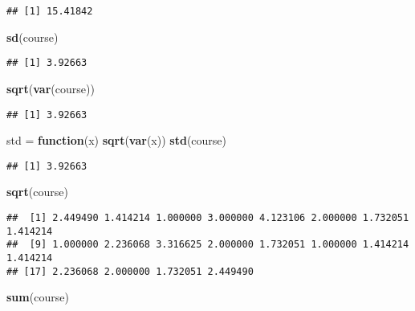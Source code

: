 \documentclass[
]{article}
\newenvironment{Shaded}{\begin{snugshade}}{\end{snugshade}}
\newcommand{\ControlFlowTok}[1]{\textcolor[rgb]{0.13,0.29,0.53}{\textbf{#1}}}
\newcommand{\FunctionTok}[1]{\textcolor[rgb]{0.13,0.29,0.53}{\textbf{#1}}}
\newcommand{\NormalTok}[1]{#1}
\newcommand{\OtherTok}[1]{\textcolor[rgb]{0.56,0.35,0.01}{#1}}
\begin{document}
\begin{verbatim}
## [1] 15.41842
\end{verbatim}

\begin{Shaded}
\begin{Highlighting}[]
\FunctionTok{sd}\NormalTok{(course)}
\end{Highlighting}
\end{Shaded}

\begin{verbatim}
## [1] 3.92663
\end{verbatim}

\begin{Shaded}
\begin{Highlighting}[]
\FunctionTok{sqrt}\NormalTok{(}\FunctionTok{var}\NormalTok{(course))}
\end{Highlighting}
\end{Shaded}

\begin{verbatim}
## [1] 3.92663
\end{verbatim}

\begin{Shaded}
\begin{Highlighting}[]
\NormalTok{std }\OtherTok{=} \ControlFlowTok{function}\NormalTok{(x) }\FunctionTok{sqrt}\NormalTok{(}\FunctionTok{var}\NormalTok{(x))}
\FunctionTok{std}\NormalTok{(course)}
\end{Highlighting}
\end{Shaded}

\begin{verbatim}
## [1] 3.92663
\end{verbatim}

\begin{Shaded}
\begin{Highlighting}[]
\FunctionTok{sqrt}\NormalTok{(course)}
\end{Highlighting}
\end{Shaded}

\begin{verbatim}
##  [1] 2.449490 1.414214 1.000000 3.000000 4.123106 2.000000 1.732051 1.414214
##  [9] 1.000000 2.236068 3.316625 2.000000 1.732051 1.000000 1.414214 1.414214
## [17] 2.236068 2.000000 1.732051 2.449490
\end{verbatim}

\begin{Shaded}
\begin{Highlighting}[]
\FunctionTok{sum}\NormalTok{(course)}
\end{Highlighting}
\end{Shaded}
\end{document}
